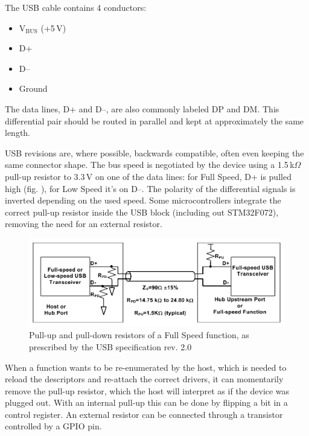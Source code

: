 The USB cable contains 4 conductors:

\begin{itemize}\setlength\itemsep{.2em}
	\item V$_\mathrm{BUS}$ (+5\,V)
	\item D+
	\item D--
	\item Ground
\end{itemize}

The data lines, D+ and D--, are also commonly labeled DP and DM. This differential pair should be routed in parallel and kept at approximately the same length.

USB revisions are, where possible, backwards compatible, often even keeping the same connector shape. The bus speed is negotiated by the device using a 1.5\,k$\Omega$ pull-up resistor to 3.3\,V on one of the data lines: for Full Speed, D+ is pulled high (fig. \label{fig:usb-pullup-fs}), for Low Speed it's on D--. The polarity of the differential signals is inverted depending on the used speed. Some microcontrollers integrate the correct pull-up resistor inside the USB block (including out STM32F072), removing the need for an external resistor.

\begin{figure}
	\centering
	\includegraphics[width=\textwidth]{img/usb-pullup-fs.png}
	\caption{\label{fig:usb-pullup-fs}Pull-up and pull-down resistors of a Full Speed function, as prescribed by the USB specification rev. 2.0}
\end{figure}

When a function wants to be re-enumerated by the host, which is needed to reload the descriptors and re-attach the correct drivers, it can momentarily remove the pull-up resistor, which the host will interpret as if the device was plugged out. With an internal pull-up this can be done by flipping a bit in a control register. An external resistor can be connected through a transistor controlled by a GPIO pin. 


